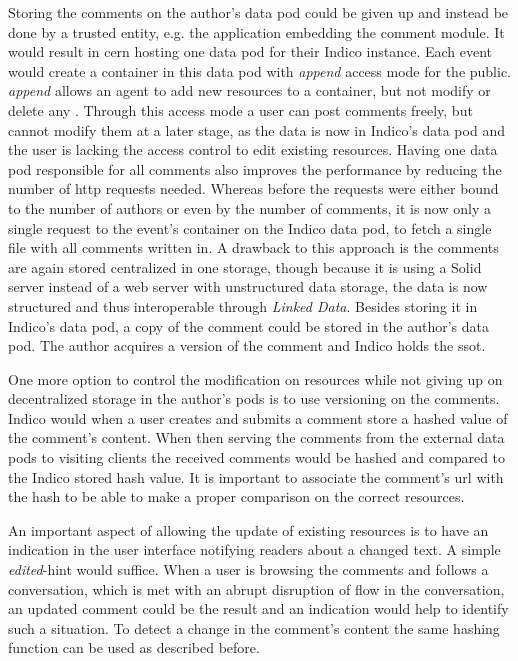 Storing the comments on the author's data pod could be given up and instead be done by a trusted entity, e.g. the application embedding the comment module. It would result in \gls{cern} hosting one data pod for their Indico instance. Each event would create a container in this data pod with \textit{append} access mode for the public. \textit{append} allows an agent to add new resources to a container, but not modify or delete any \cite{solid-protocol}. Through this access mode a user can post comments freely, but cannot modify them at a later stage, as the data is now in Indico's data pod and the user is lacking the access control to edit existing resources. Having one data pod responsible for all comments also improves the performance by reducing the number of \gls{http} requests needed. Whereas before the requests were either bound to the number of authors or even by the number of comments, it is now only a single request to the event's container on the Indico data pod, to fetch a single file with all comments written in. A drawback to this approach is the comments are again stored centralized in one storage, though because it is using a Solid server instead of a web server with unstructured data storage, the data is now structured and thus interoperable through \textit{Linked Data}. Besides storing it in Indico's data pod, a copy of the comment could be stored in the author's data pod. The author acquires a version of the comment and Indico holds the \gls{ssot}.

One more option to control the modification on resources while not giving up on decentralized storage in the author's pods is to use versioning on the comments. Indico would when a user creates and submits a comment store a hashed value of the comment's content. When then serving the comments from the external data pods to visiting clients the received comments would be hashed and compared to the Indico stored hash value. It is important to associate the comment's \gls{url} with the hash to be able to make a proper comparison on the correct resources.

An important aspect of allowing the update of existing resources is to have an indication in the user interface notifying readers about a changed text. A simple \textit{edited}-hint would suffice. When a user is browsing the comments and follows a conversation, which is met with an abrupt disruption of flow in the conversation, an updated comment could be the result and an indication would help to identify such a situation.  To detect a change in the comment's content the same hashing function can be used as described before.
\vspace{0.5cm}
